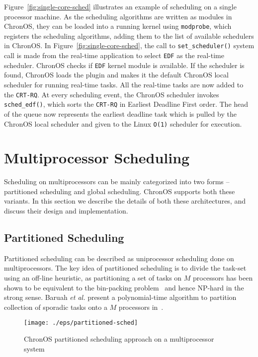 \documentclass[12pt,dvips]{report}
\begin{document}
Figure~\ref{fig:single-core-sched} illustrates an example of scheduling on a single processor machine. As the scheduling algorithms are written as modules in ChronOS, they can be loaded into a running kernel using \texttt{modprobe}, which registers the scheduling algorithms, adding them to the list of available schedulers in ChronOS. In Figure~\ref{fig:single-core-sched}, the call to \texttt{set\_scheduler()} system call is made from the real-time application to select \texttt{EDF} as the real-time scheduler. ChronOS checks if \texttt{EDF} kernel module is available. If the scheduler is found, ChronOS loads the plugin and makes it the default ChronOS local scheduler for running real-time tasks. All the real-time tasks are now added to the \texttt{CRT-RQ}. At every scheduling event, the ChronOS scheduler invokes \texttt{sched\_edf()}, which sorts the \texttt{CRT-RQ} in Earliest Deadline First order. The head of the queue now represents the earliest deadline task which is pulled by the ChronOS local scheduler and given to the Linux \texttt{O(1)} scheduler for execution.

\section{Multiprocessor Scheduling}

Scheduling on multiprocessors can be mainly categorized into two forms -- partitioned scheduling and global scheduling. ChronOS supports both these variants. In this section we describe the details of both these architectures, and discuss their design and implementation.

\subsection{Partitioned Scheduling}
Partitioned scheduling can be described as uniprocessor scheduling done on multiprocessors. The key idea of partitioned scheduling is to divide the task-set using an off-line heuristic, as partitioning a set of tasks on $M$ processors has been shown to be equivalent to the bin-packing problem~\cite{binpacking} and hence NP-hard in the strong sense. Baruah \textit{et al.} present a polynomial-time algorithm to partition collection of sporadic tasks onto a $M$ processors in~\cite{baruah_part05}.

\begin{figure} [htbp]
  \centering
  \texttt{[image: ./eps/partitioned-sched]}
  \caption{ChronOS partitioned scheduling approach on a multiprocessor system}
  \label{fig:partitioned-sched}
\end{figure}
\end{document}
